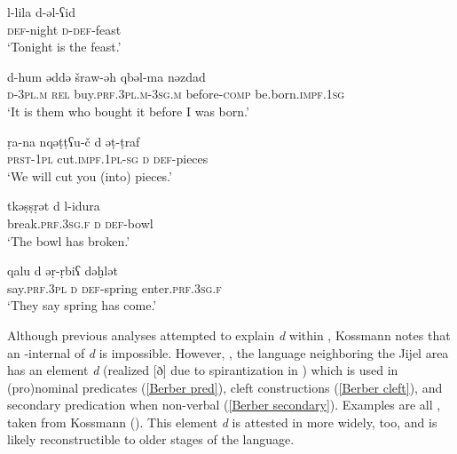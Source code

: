 \documentclass[output=paper]{langsci/langscibook}
\begin{document}
\begin{exe}
\ex\label{nonverbal}

\gll l-lila  d-ǝl-ʕid\\
     \textsc{def}-night  \textsc{d}-\textsc{def}-feast\\
\glt ‘Tonight is the feast.’
\ex\label{clefts}

\gll d-hum  ǝddǝ  šraw-ǝh   qbǝl-ma  nǝzdad\\
     \textsc{d}-\textsc{3pl.m} \textsc{rel}  buy.\textsc{prf.3pl.m}-\textsc{3sg.m}  before-\textsc{comp} be.born.\textsc{impf.1sg}\\
\glt ‘It is them who bought it before I was born.’
\ex\label{secondary pred}

\gll ṛa-na  nqǝṭṭʕu-č  d  ǝṭ-ṭraf\\
     \textsc{prst}-\textsc{1pl}  cut.\textsc{impf.1pl-sg}  \textsc{d}  \textsc{def}-pieces\\
\glt ‘We will cut you (into) pieces.’
\ex\label{focus}

\gll tkǝṣṣṛǝt  d  l-idura\\
     break.\textsc{prf.3sg.f}  \textsc{d}  \textsc{def}-bowl\\
\glt ‘The bowl has broken.’
\ex\label{left focalizations}

\gll qalu  d  ǝṛ-ṛbiʕ  dǝḫlǝt\\
     say.\textsc{prf.3pl}  \textsc{d}  \textsc{def}-spring  enter.\textsc{prf.3sg.f}\\
\glt ‘They say spring has come.’
\end{exe}

Although previous analyses attempted to explain \textit{d} within , Kossmann notes that an -internal  of \textit{d} is impossible. However, , the  language neighboring the Jijel area has an element \textit{d} (realized [ð] due to spirantization in ) which is used in (pro)nominal predicates (\ref{Berber pred}), cleft constructions (\ref{Berber cleft}), and secondary predication when non-verbal (\ref{Berber secondary}). Examples  are all  , taken from Kossmann (\citeyear[135]{Kossmann2014}). This element \textit{d} is attested in  more widely, too, and is likely reconstructible to older stages of the language.
\end{document}
